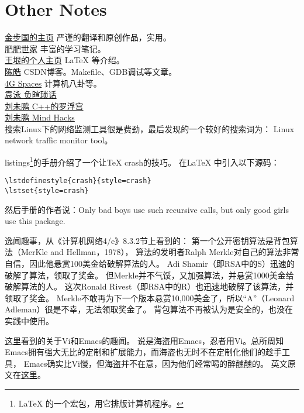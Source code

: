 \chapter{Other Notes}
\noindent\href{http://lamp.linux.gov.cn/jinbuguo\_florilegium.html}{金步国的主页} 
严谨的翻译和原创作品，实用。\\
\noindent\href{http://www.ringkee.com/}{肥肥世家}
丰富的学习笔记。\\
\noindent\href{http://docs.huihoo.com/homepage/shredderyin/}{王垠的个人主页}
\LaTeX{} 等介绍。\\
\noindent\href{blog.csdn.net/haoel}{陈皓} CSDN博客。Makefile、GDB调试等文章。\\
\noindent\href{http://blog.youxu.info/}{4G Spaces} 计算机八卦等。\\
\noindent\href{http://blog.csdn.net/g9yuayon/}{袁泳 \textbar{} 负暄琐话} \\
\noindent\href{http://blog.csdn.net/pongba/}{刘未鹏 \textbar{} C++的罗浮宫} \\
\noindent\href{http://mindhacks.cn/}{刘未鹏 \textbar{} Mind Hacks} \\

 搜索Linux下的网络监测工具很是费劲，最后发现的一个较好的搜索词为：
Linux network traffic monitor tool。

listings\footnote{\LaTeX{} 的一个宏包，用它排版计算机程序。}的手册介绍了一个让\TeX{} crash的技巧。
在\LaTeX{} 中引入以下源码：
\begin{lstlisting}
\lstdefinestyle{crash}{style=crash}
\lstset{style=crash}
\end{lstlisting}
然后手册的作者说：Only bad boys use such recursive calls, 
but only good girls use this package.

逸闻趣事，从《计算机网络4/e》8.3.2节上看到的：
第一个公开密钥算法是背包算法（MerKle and Hellman，1978），
算法的发明者Ralph Merkle对自己的算法非常自信，因此他悬赏100美金给破解算法的人。
Adi Shamir（即RSA中的S）迅速的破解了算法，领取了奖金。
但Merkle并不气馁，又加强算法，并悬赏1000美金给破解算法的人。
这次Ronald Rivest（即RSA中的R）也迅速地破解了该算法，并领取了奖金。
Merkle不敢再为下一个版本悬赏10,000美金了，所以“A”（Leonard Adleman）很是不幸，无法领取奖金了。
背包算法不再被认为是安全的，也没在实践中使用。

\href{http://developers.solidot.org/article.pl?sid=09/03/24/0859257}{这里}看到的关于Vi和Emacs的趣闻。
说是海盗用Emacs，忍者用Vi。总所周知Emacs拥有强大无比的定制和扩展能力，而海盗也无时不在定制化他们的趁手工具，
Emacs确实比Vi慢，但海盗并不在意，因为他们经常喝的醉醺醺的。
英文原文在\href{http://philosecurity.org/2009/03/23/pirates-and-ninjas-emacs-or-vi}{这里}。

